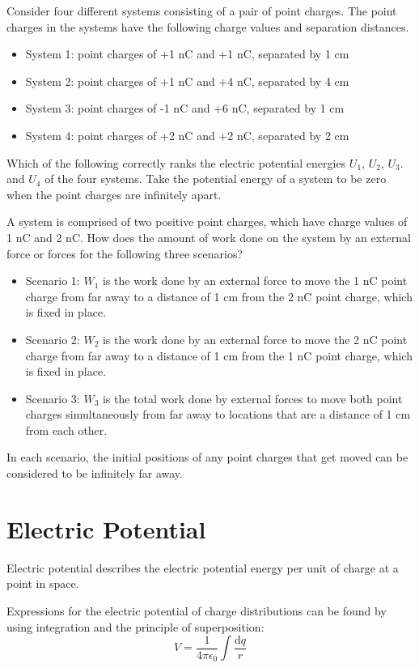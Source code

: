 \documentclass[../em.tex]{subfiles}
\begin{document}
\ex Consider four different systems consisting of a pair of point charges. The point charges in the systems have the following charge values and separation distances.
\begin{itemize}
    \item System 1: point charges of +1 nC and +1 nC, separated by 1 cm 
    \item System 2: point charges of +1 nC and +4 nC, separated by 4 cm 
    \item System 3: point charges of -1 nC and +6 nC, separated by 1 cm 
    \item System 4: point charges of +2 nC and +2 nC, separated by 2 cm
\end{itemize}
Which of the following correctly ranks the electric potential energies $U_1$, $U_2$, $U_3$. and $U_4$ of the four systems. Take the potential energy of a system to be zero when the point charges are infinitely apart.

\ex A system is comprised of two positive point charges, which have charge values of 1 nC and 2 nC. How does the amount of work done on the system by an external force or forces for the following three scenarios?
\begin{itemize}
    \item Scenario 1: $W_1$ is the work done by an external force to move the 1 nC point charge from far away to a distance of 1 cm from the 2 nC point charge, which is fixed in place.
    \item Scenario 2: $W_2$ is the work done by an external force to move the 2 nC point charge from far away to a distance of 1 cm from the 1 nC point charge, which is fixed in place.
    \item Scenario 3: $W_3$ is the total work done by external forces to move both point charges simultaneously from far away to locations that are a distance of 1 cm from each other.
\end{itemize}
In each scenario, the initial positions of any point charges that get moved can be considered to be infinitely far away.

\section{Electric Potential}
Electric potential describes the electric potential energy per unit of charge at a point in space.

Expressions for the electric potential of charge distributions can be found by
using integration and the principle of superposition:
\[V=\frac{1}{4\pi\epsilon_0}\int \frac{\mathrm{d}q}{r}\]
\end{document}
